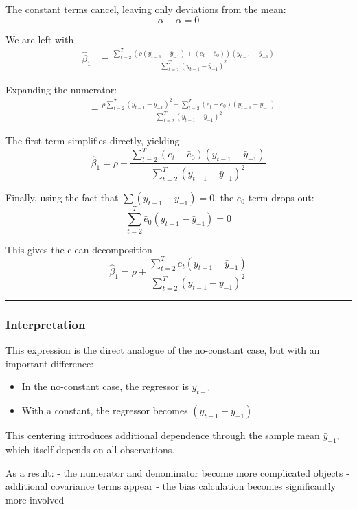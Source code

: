 \documentclass[11pt]{article}
\providecommand{\tightlist}{%
      \setlength{\itemsep}{0pt}\setlength{\parskip}{0pt}}
\begin{document}
The constant terms cancel, leaving only deviations from the mean: \[
\alpha - \alpha = 0
\]

We are left with \[
\begin{aligned}
\hat\beta_{1}
&= \frac{\sum_{t=2}^{T} (\rho(y_{t-1}-\bar y_{-1}) + (e_t - \bar e_0))(y_{t-1}-\bar y_{-1})}
{\sum_{t=2}^{T} (y_{t-1}-\bar y_{-1})^2}
\end{aligned}
\]

Expanding the numerator: \[
\begin{aligned}
&= \frac{\rho \sum_{t=2}^{T} (y_{t-1}-\bar y_{-1})^2
+ \sum_{t=2}^{T} (e_t - \bar e_0)(y_{t-1}-\bar y_{-1})}
{\sum_{t=2}^{T} (y_{t-1}-\bar y_{-1})^2}
\end{aligned}
\]

The first term simplifies directly, yielding \[
\hat\beta_{1}
= \rho+\frac{\sum_{t=2}^{T} (e_t - \bar e_0)(y_{t-1}-\bar y_{-1})}
{\sum_{t=2}^{T} (y_{t-1}-\bar y_{-1})^2}
\]

Finally, using the fact that \(\sum (y_{t-1}-\bar y_{-1}) = 0\), the
\(\bar e_0\) term drops out: \[
\sum_{t=2}^T \bar e_0 (y_{t-1}-\bar y_{-1}) = 0
\]

This gives the clean decomposition \[
\hat\beta_{1}
= \rho+\frac{\sum_{t=2}^{T} e_t(y_{t-1}-\bar y_{-1})}
{\sum_{t=2}^{T} (y_{t-1}-\bar y_{-1})^2}
\]

\begin{center}\rule{0.5\linewidth}{0.5pt}\end{center}

\subsubsection{Interpretation}\label{interpretation}

This expression is the direct analogue of the no-constant case, but with
an important difference:

\begin{itemize}
\tightlist
\item
  In the no-constant case, the regressor is \(y_{t-1}\)
\item
  With a constant, the regressor becomes \((y_{t-1} - \bar y_{-1})\)
\end{itemize}

This centering introduces additional dependence through the sample mean
\(\bar y_{-1}\), which itself depends on all observations.

As a result: - the numerator and denominator become more complicated
objects - additional covariance terms appear - the bias calculation
becomes significantly more involved
\end{document}
